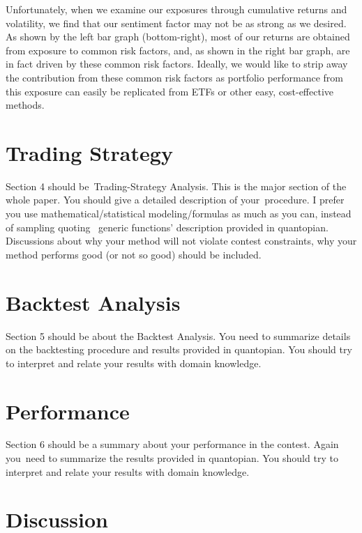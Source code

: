 \documentclass[11,]{article}
\begin{document}
Unfortunately, when we examine our exposures through cumulative returns
and volatility, we find that our sentiment factor may not be as strong
as we desired. As shown by the left bar graph (bottom-right), most of
our returns are obtained from exposure to common risk factors, and, as
shown in the right bar graph, are in fact driven by these common risk
factors. Ideally, we would like to strip away the contribution from
these common risk factors as portfolio performance from this exposure
can easily be replicated from ETFs or other easy, cost-effective
methods.

\hypertarget{trading-strategy}{%
\section{Trading Strategy}\label{trading-strategy}}

Section 4 should be~Trading-Strategy Analysis. This is the major section
of the whole paper. You should give a detailed description of
your~procedure. I prefer you use mathematical/statistical
modeling/formulas as much as you can, instead of sampling quoting
~generic functions' description provided in quantopian. Discussions
about why your method will not violate contest constraints, why your
method performs good (or not so good) should be included.~

\hypertarget{backtest-analysis}{%
\section{Backtest Analysis}\label{backtest-analysis}}

Section 5 should be about the Backtest Analysis. You need to summarize
details on the backtesting procedure and results provided in quantopian.
You should try to interpret and relate your results with domain
knowledge.~

\hypertarget{performance}{%
\section{Performance}\label{performance}}

Section 6 should be a summary about your performance in the contest.
Again you~need to summarize the results provided in quantopian. You
should try to interpret and relate your results with domain knowledge.~

\hypertarget{discussion}{%
\section{Discussion}\label{discussion}}
\end{document}
